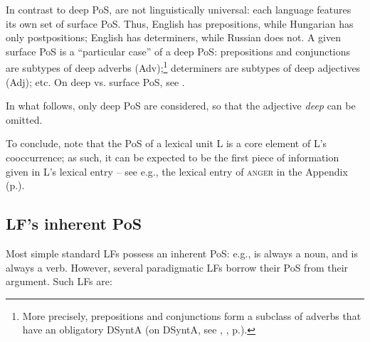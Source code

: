 In contrast to deep PoS,  are not linguistically universal: each language features its own set of surface PoS. Thus, English has prepositions, while Hungarian has only postpositions; English has determiners, while Russian does not. A given surface PoS is a ``particular case'' of a deep PoS: prepositions and conjunctions are subtypes of deep adverbs (Adv);\footnote{More precisely, prepositions and conjunctions form a subclass of adverbs that have an obligatory DSyntA\thinspace{} (on DSyntA, see , , p.\thinspace\pageref{def:DSyntA}).} determiners are subtypes of deep adjectives (Adj); etc. On deep vs. surface PoS, see \textcite[Ch.~7, Sec.~2.1.3, 49--51]{Melcuk2013c-e}.\label{txt:PrepAdv}

In what follows, only deep PoS are considered, so that the adjective \textit{deep} can be omitted.

To conclude, note that the PoS of a lexical unit L is a core element of L's cooccurrence; as such, it can be expected to be the first piece of information given in L's lexical entry -- see e.g., the lexical entry of \textsc{anger} in the Appendix (p.\thinspace\pageref{chap:appendix1}).

\subsection{LF's inherent PoS}\label{sec:LFsInherentPoS}

Most simple standard LFs possess an inherent PoS: e.g.,  is always a noun, and  is always a verb. However, several paradigmatic LFs borrow their PoS from their argument. Such LFs are:

